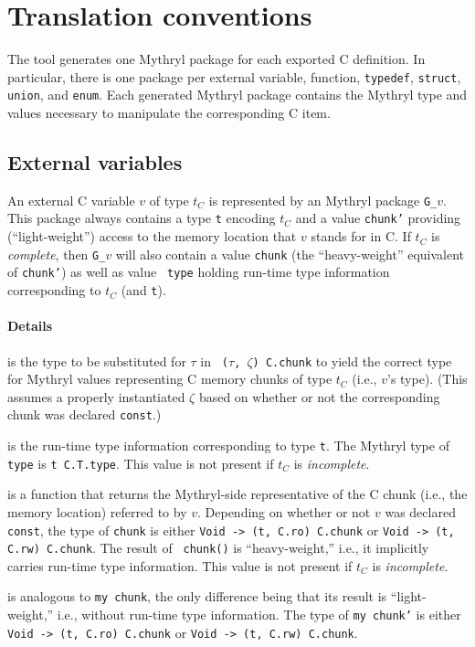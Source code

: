 \section{Translation conventions}

The {\cgluemaker} tool generates one Mythryl package for each
exported C definition.  In particular, there is one package per
external variable, function, {\tt typedef}, {\tt struct}, {\tt union},
and {\tt enum}.
Each generated Mythryl package contains the Mythryl type and values necessary
to manipulate the corresponding C item.

\subsection{External variables}

An external C variable $v$ of type $t_C$ is represented by an Mythryl
package {\tt G\_}$v$.  This package always contains a type {\tt t}
encoding $t_C$ and a value {\tt chunk'} providing (``light-weight'')
access to the memory location that $v$ stands for in C.  If $t_C$ is
{\em complete}, then {\tt G\_}$v$ will also contain a value {\tt chunk}
(the ``heavy-weight'' equivalent of {\tt chunk'}) as well as value {\tt
  type} holding run-time type information corresponding to $t_C$ (and
{\tt t}).

\paragraph*{Details}

\begin{description}\setlength{\itemsep}{0pt}
\item[{\tt type t}] is the type to be substituted for $\tau$ in {\tt
    ($\tau$, $\zeta$) C.chunk} to yield the correct type for Mythryl values
  representing C memory chunks of type $t_C$ (i.e., $v$'s type).
  (This assumes a properly instantiated $\zeta$ based on whether or
  not the corresponding chunk was declared {\tt const}.)
\item[!{\tt my type}] is the run-time type information corresponding
  to type {\tt t}.  The Mythryl type of {\tt type} is {\tt t C.T.type}.  This
  value is not present if $t_C$ is {\em incomplete}.
\item[!{\tt my chunk}] is a function that returns the Mythryl-side
  representative of the C chunk (i.e., the memory location) referred
  to by $v$.  Depending on whether or not $v$ was declared {\tt
    const}, the type of {\tt chunk} is either {\tt Void -> (t, C.ro)
    C.chunk} or {\tt Void -> (t, C.rw) C.chunk}.  The result of {\tt
    chunk()} is ``heavy-weight,'' i.e., it implicitly carries run-time
  type information.  This value is not present if $t_C$ is {\em
    incomplete}.
\item[{\tt my chunk'}] is analogous to {\tt my chunk}, the only
  difference being that its result is ``light-weight,'' i.e., without
  run-time type information.  The type of {\tt my chunk'} is
  either {\tt Void -> (t, C.ro) C.chunk} or {\tt Void -> (t, C.rw) C.chunk}.
\end{description}

